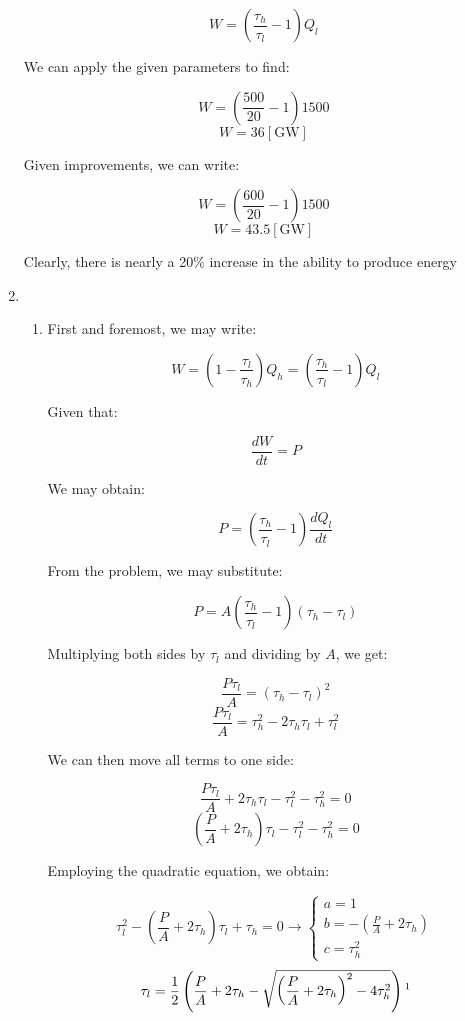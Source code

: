 \begin{enumerate}
    $$W=\left( \frac{\tau_h}{\tau_l}-1 \right)Q_l$$

    We can apply the given parameters to find:

    $$W=\left( \frac{500}{20}-1 \right)1500$$
    $$\boxed{W=36[\si{\giga\watt}]}$$

    Given improvements, we can write:

    $$W=\left( \frac{600}{20}-1 \right)1500$$
    $$\boxed{W=43.5[\si{\giga\watt}]}$$

    Clearly, there is nearly a 20\% increase in the ability to produce energy

  \item

    \begin{enumerate}

      \item 

        First and foremost, we may write:

        $$W=\left( 1-\frac{\tau_l}{\tau_h} \right)Q_h=\left( \frac{\tau_h}{\tau_l}-1 \right)Q_l$$

        Given that:

        $$\frac{dW}{dt}=P$$

        We may obtain:

        $$P=\left( \frac{\tau_h}{\tau_l}-1 \right)\frac{dQ_l}{dt}$$

        From the problem, we may substitute:

        $$P=A\left( \frac{\tau_h}{\tau_l}-1 \right)(\tau_h-\tau_l)$$

        Multiplying both sides by $\tau_l$ and dividing by $A$, we get:

        $$\frac{P\tau_l}{A}=(\tau_h-\tau_l)^2$$
        $$\frac{P\tau_l}{A}=\tau_h^2-2\tau_h\tau_l+\tau_l^2$$

        We can then move all terms to one side:

        $$\frac{P\tau_l}{A}+2\tau_h\tau_l-\tau_l^2-\tau_h^2=0$$
        $$\left(\frac{P}{A}+2\tau_h\right)\tau_l-\tau_l^2-\tau_h^2=0$$

        Employing the quadratic equation, we obtain:

        $$\tau_l^2-\left( \frac{P}{A}+2\tau_h \right)\tau_l+\tau_h=0\to \left\{\begin{array}{l} a=1\\b=-\left( \frac{P}{A}+2\tau_h \right)\\c=\tau_h^2\end{array}$$
        $$\tau_l=\frac{1}{2}\left( \frac{P}{A}+2\tau_h-\sqrt{\left( \frac{P}{A}+2\tau_h \right)^2-4\tau_h^2}\right)\text{\footnote{Note: we can forego the solution with a positive determinant, as that would make $\tau_l>\tau_h$}}$$


\end{enumerate}
\end{enumerate}
